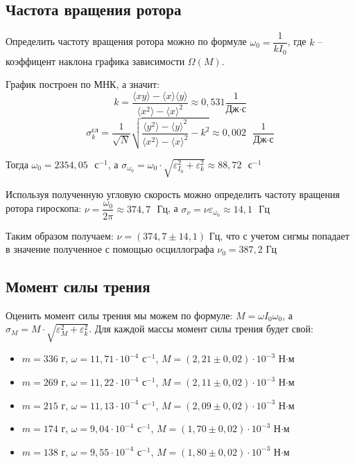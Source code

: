 \documentclass[a4paper,12pt]{article}
\begin{document}
	\subsection{Частота вращения ротора}
	Определить частоту вращения ротора можно по формуле $\omega_0 = \dfrac{1}{kI_0}$, где $k$ -- коэффицент наклона графика зависимости $\Omega(M)$.

	График построен по МНК, а значит:
	\begin{equation}
	k=\frac{\langle xy\rangle-\langle x\rangle \langle y\rangle}{\langle x^2\rangle - \langle x\rangle^2}\approx 0,531\frac{1}{\text{Дж}\cdot\text{с}}
	\end{equation}
	\begin{equation}
		\sigma_k^\text{сл}=\frac{1}{\sqrt{N}}\sqrt{\frac{\langle y^2 \rangle - \langle y \rangle^2}{\langle x^2 \rangle - \langle x \rangle^2} - k^2  } \approx 0,002\text{ }\frac{1}{\text{Дж}\cdot\text{с}}
	\end{equation}

	Тогда $\omega_0 = 2354,05\text{ }\text{с}^{-1}$, а $\sigma_{\omega_0} = \omega_0\cdot\sqrt{\varepsilon_{I_0}^2+ \varepsilon_k^2} \approx 88,72\text{ }\text{с}^{-1}$

	Используя полученную угловую скорость можно определить частоту вращения ротора гироскопа: $\nu = \dfrac{\omega_0}{2\pi} \approx 374,7\text{ }\text{Гц}$, а $\sigma_{\nu} = \nu\varepsilon_{\omega_0} \approx 14,1\text{ }\text{Гц}$

	Таким образом получаем: $\nu = (374,7\pm14,1)\text{ Гц}$, что с учетом сигмы попадает в значение полученное с помощью осциллографа $\nu_0 = 387,2\text{ Гц}$

	\subsection{Момент силы трения}

	Оценить момент силы трения мы можем по формуле: $M = \omega I_0 \omega_0$, а $\sigma_M = M\cdot\sqrt{\varepsilon_M^2+ \varepsilon_k^2}$. Для каждой массы момент силы трения будет свой:

	\begin{itemize}
		\item $m = 336$ г, $\omega = 11,71\cdot 10^{-4}$ $\text{с}^{-1}$, $M = (2,21\pm0,02)\cdot10^{-3}$ Н$\cdot$м
		\item $m = 269$ г, $\omega = 11,22\cdot 10^{-4}$ $\text{с}^{-1}$, $M = (2,11\pm0,02)\cdot10^{-3}$ Н$\cdot$м
		\item $m = 215$ г, $\omega = 11,13\cdot 10^{-4}$ $\text{с}^{-1}$, $M = (2,09\pm0,02)\cdot10^{-3}$ Н$\cdot$м
		\item $m = 174$ г, $\omega = 9,04\cdot 10^{-4}$ $\text{с}^{-1}$, $M = (1,70\pm 0,02)\cdot10^{-3}$ Н$\cdot$м
		\item $m = 138$ г, $\omega = 9,55\cdot 10^{-4}$ $\text{с}^{-1}$, $M = (1,80 \pm 0,02)\cdot10^{-3}$ Н$\cdot$м
	\end{itemize}
\end{document}
